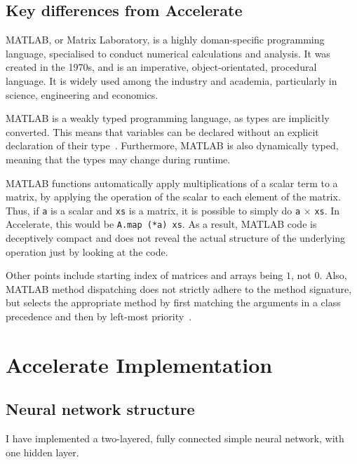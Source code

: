 \subsection{Key differences from Accelerate} \label{se:impl.matlab.background}

MATLAB, or Matrix Laboratory, is a highly doman-specific programming language, specialised to conduct numerical calculations and analysis. It was created in the 1970s, and is an imperative, object-orientated, procedural language. It is widely used among the industry and academia, particularly in science, engineering and economics.

MATLAB is a weakly typed programming language, as types are implicitly converted. This means that variables can be declared without an explicit declaration of their type~\cite{Wiki1}. Furthermore, MATLAB is also dynamically typed, meaning that the types may change during runtime. 

MATLAB functions automatically apply multiplications of a scalar term to a matrix, by applying the operation of the scalar to each element of the matrix. Thus, if \texttt{a} is a scalar and \texttt{xs} is a matrix, it is possible to simply do \texttt{a} $\times$ \texttt{xs}. In Accelerate, this would be \texttt{A.map (*a) xs}. As a result, MATLAB code is deceptively compact and does not reveal the actual structure of the underlying operation just by looking at the code. 

Other points include starting index of matrices and arrays being $1$, not $0$. Also, MATLAB method dispatching does not strictly adhere to the method signature, but selects the appropriate method by first matching the arguments in a class precedence and then by left-most priority~\cite{Mat17}. %

\section{Accelerate Implementation} \label{se:impl.acc}

\subsection{Neural network structure} \label{se:impl.nn.struct}

I have implemented a two-layered, fully connected simple neural network, with one hidden layer.

